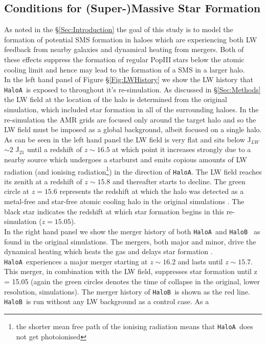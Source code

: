 \documentclass[graphics, twocolumn, usenatbib]{mn2e}
\newcommand{\JLW} {J$_{LW}$}
\newcommand{\ha} {\texttt{HaloA~}}
\newcommand{\hb} {\texttt{HaloB~}}
\newcommand{\hac} {\texttt{HaloA}}
\begin{document}
\subsection{Conditions for (Super-)Massive Star Formation}
As noted in the \S \ref{Sec:Introduction} the goal of this study is to model the formation of
potential SMS formation in haloes which are experiencing both LW feedback from nearby galaxies and
dynamical heating from mergers. Both of these effects suppress the formation of regular PopIII stars
below the atomic cooling limit and hence may lead to the formation of a SMS in a larger halo. \\
\indent In the left hand panel of Figure \S \ref{Fig:LWHistory} we show the LW history that \ha is
exposed to throughout it's re-simulation. As discussed in \S \ref{Sec:Methods} the LW field at the
location of the halo is determined from the original simulation, which included star formation
in all of the surrounding haloes. In the re-simulation the AMR grids are focused only around the
target halo and so the LW field must be imposed as a global background, albeit focused on a single
halo. As can be seen in the left hand panel the LW field is very flat and sits below \JLW $\sim 2$
J$_{21}$ until a redshift of $z \sim 16.5$ at which point it increases strongly due to a nearby source
which undergoes a starburst and emits copious amounts of LW radiation
(and ionising radiation\footnote{the
  shorter mean free path of the ionising radiation means that \ha does not get photoionised}) in the
direction of \hac. The LW field reaches its zenith at a redshift of $z \sim 15.8$ and thereafter
starts to decline. The green circle at $z = 15.6$ represents the redshift at which the halo was
detected as a metal-free and star-free atomic cooling halo in the original simulations
\citep{Regan_2019}. The black star indicates the redshift at which star formation begins in this
re-simulation ($z = 15.05$). \\
\indent In the right hand panel we show the merger history of both \ha and \hb
as found in the original simulations. The mergers, both major and minor, drive the dynamical heating
which heats the gas and delays star formation \citep{Wise_2019}. 
\ha experiences a major merger starting at $z \sim 16.2$ and lasts until $z \sim 15.7$. This
merger, in combination with the LW field, suppresses star formation until z = 15.05 (again the green
circles denotes the time of collapse in the original, lower resolution, simulations). The merger
history of \hb is shown as the red line. \hb is run without any LW background as a control case. As a
\end{document}

